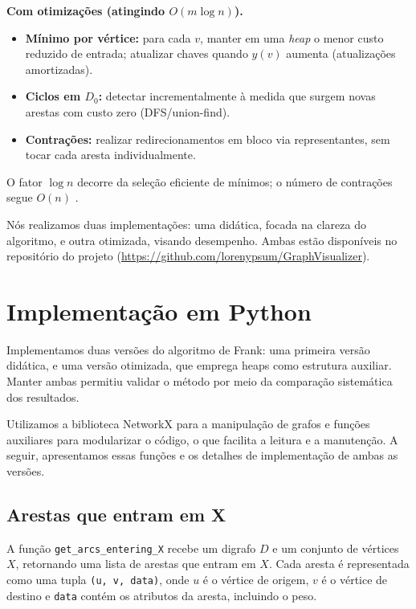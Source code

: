 \textbf{Com otimizações (atingindo \(O(m\log n)\)).}
\begin{itemize}\setlength{\itemsep}{2pt}
	\item \textbf{Mínimo por vértice:} para cada \(v\), manter em uma \emph{heap} o menor custo reduzido de entrada; atualizar chaves quando \(y(v)\) aumenta (atualizações amortizadas).
	\item \textbf{Ciclos em \(D_0\):} detectar incrementalmente à medida que surgem novas arestas com custo zero (DFS/union-find).
	\item \textbf{Contrações:} realizar redirecionamentos em bloco via representantes, sem tocar cada aresta individualmente.
\end{itemize}
O fator \(\log n\) decorre da seleção eficiente de mínimos; o número de contrações segue \(O(n)\) \cite{frank2014,schrijver2003comb}.

Nós realizamos duas implementações: uma didática, focada na clareza do algoritmo, e outra otimizada, visando desempenho. Ambas estão disponíveis no repositório do projeto (\url{https://github.com/lorenypsum/GraphVisualizer}).

\section{Implementação em Python}


Implementamos duas versões do algoritmo de Frank: uma primeira versão didática, e uma versão otimizada, que emprega heaps como estrutura auxiliar. Manter ambas permitiu validar o método por meio da comparação sistemática dos resultados.


Utilizamos a biblioteca NetworkX para a manipulação de grafos e funções auxiliares para modularizar o código, o que facilita a leitura e a manutenção. A seguir, apresentamos essas funções e os detalhes de implementação de ambas as versões.

\subsection{Arestas que entram em X}

A função \texttt{get\_arcs\_entering\_X} recebe um digrafo \(D\) e um conjunto de vértices \(X\), retornando uma lista de arestas que entram em \(X\). Cada aresta é representada como uma tupla \texttt{(u, v, data)}, onde \(u\) é o vértice de origem, \(v\) é o vértice de destino e \texttt{data} contém os atributos da aresta, incluindo o peso.

